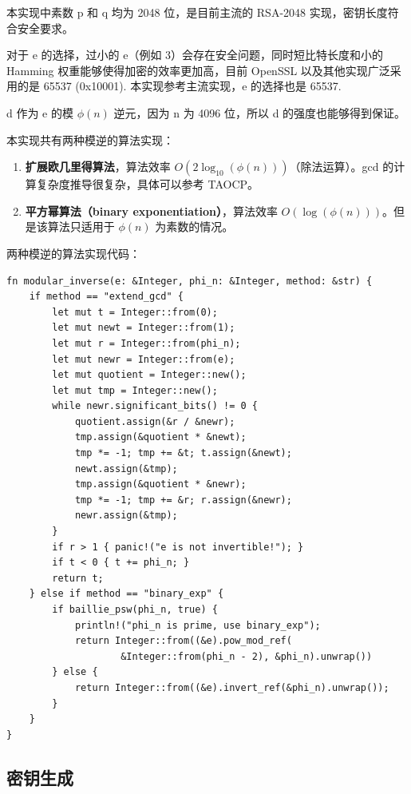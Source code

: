 \documentclass[degree=project,degree-type=project,cjk-font=noto]{thuthesis}
\begin{document}
本实现中素数 p 和 q 均为 2048 位，是目前主流的 RSA-2048 实现，密钥长度符合安全要求。

对于 e 的选择，过小的 e（例如 3）会存在安全问题，同时短比特长度和小的 Hamming 权重能够使得加密的效率更加高，目前 OpenSSL 以及其他实现广泛采用的是 65537 (0x10001).
本实现参考主流实现，e 的选择也是 65537.

d 作为 e 的模 $\phi(n)$ 逆元，因为 n 为 4096 位，所以 d 的强度也能够得到保证。

本实现共有两种模逆的算法实现：

\begin{enumerate}
  \item \textbf{扩展欧几里得算法}，算法效率 $O(2 \log_{10}(\phi(n)))$（除法运算）。gcd 的计算复杂度推导很复杂，具体可以参考 TAOCP。
  \item \textbf{平方幂算法（binary exponentiation）}，算法效率 $O(\log(\phi(n)))$。但是该算法只适用于 $\phi(n)$ 为素数的情况。
\end{enumerate}

两种模逆的算法实现代码：

  \begin{verbatim}
fn modular_inverse(e: &Integer, phi_n: &Integer, method: &str) {
    if method == "extend_gcd" {
        let mut t = Integer::from(0);
        let mut newt = Integer::from(1);
        let mut r = Integer::from(phi_n);
        let mut newr = Integer::from(e);
        let mut quotient = Integer::new();
        let mut tmp = Integer::new();
        while newr.significant_bits() != 0 {
            quotient.assign(&r / &newr);
            tmp.assign(&quotient * &newt);
            tmp *= -1; tmp += &t; t.assign(&newt);
            newt.assign(&tmp);
            tmp.assign(&quotient * &newr);
            tmp *= -1; tmp += &r; r.assign(&newr);
            newr.assign(&tmp);
        }
        if r > 1 { panic!("e is not invertible!"); }
        if t < 0 { t += phi_n; }
        return t;
    } else if method == "binary_exp" {
        if baillie_psw(phi_n, true) {
            println!("phi_n is prime, use binary_exp");
            return Integer::from((&e).pow_mod_ref(
                    &Integer::from(phi_n - 2), &phi_n).unwrap())
        } else {
            return Integer::from((&e).invert_ref(&phi_n).unwrap());
        }
    }
}
  \end{verbatim}

\subsection{密钥生成}
\end{document}
